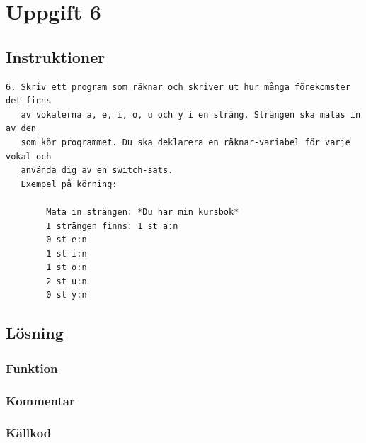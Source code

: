 \section{Uppgift 6}\label{sec:uppg06}

\subsection{Instruktioner}
\begin{verbatim}
6. Skriv ett program som räknar och skriver ut hur många förekomster det finns
   av vokalerna a, e, i, o, u och y i en sträng. Strängen ska matas in av den
   som kör programmet. Du ska deklarera en räknar-variabel för varje vokal och
   använda dig av en switch-sats.
   Exempel på körning:

        Mata in strängen: *Du har min kursbok*
        I strängen finns: 1 st a:n
        0 st e:n
        1 st i:n
        1 st o:n
        2 st u:n
        0 st y:n
\end{verbatim}


\subsection{Lösning}
\subsubsection{Funktion}

\subsubsection{Kommentar}


\subsubsection{Källkod}
\label{src:uppg06}


